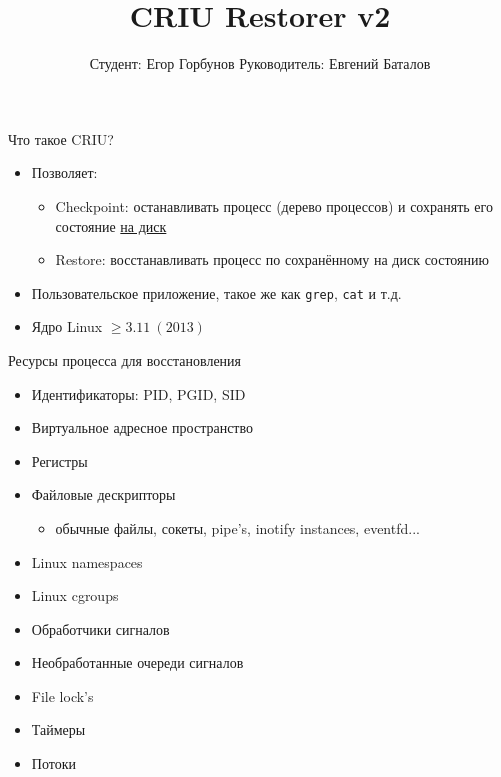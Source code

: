 
\makeatletter
{}
\makeatother
\graphicspath{{./fig/}}

\title{CRIU Restorer v2}
\author[Егор Горбунов]{
	\hspace{5cm} Студент: \hfill Егор Горбунов 
	\newline
	\hspace*{5cm} Руководитель:  \hfill Евгений Баталов
}


\maketitle

\begin{frame}{Что такое CRIU?}
\begin{itemize}
	\item Позволяет:
		\begin{itemize}
			\item \alert{Checkpoint}: останавливать процесс (дерево процессов) и сохранять его состояние \underline{на диск}
			\item \alert{Restore}: восстанавливать процесс по сохранённому на диск состоянию
		\end{itemize}
	\item Пользовательское приложение, такое же как \texttt{grep}, \texttt{cat} и т.д.
	\item Ядро Linux $\geq 3.11\ (2013)$
\end{itemize}
\end{frame}

\begin{frame}{Ресурсы процесса для восстановления}
\begin{itemize}
	\item Идентификаторы: PID, PGID, SID
	\item Виртуальное адресное пространство
	\item Регистры
	\item Файловые дескрипторы
	\begin{itemize}
		\item обычные файлы, сокеты, pipe's, inotify instances, eventfd...
	\end{itemize}
	\item Linux namespaces
	\item Linux cgroups
	\item Обработчики сигналов
	\item Необработанные очереди сигналов
	\item File lock's
	\item Таймеры
	\item Потоки
\end{itemize}
\end{frame}

